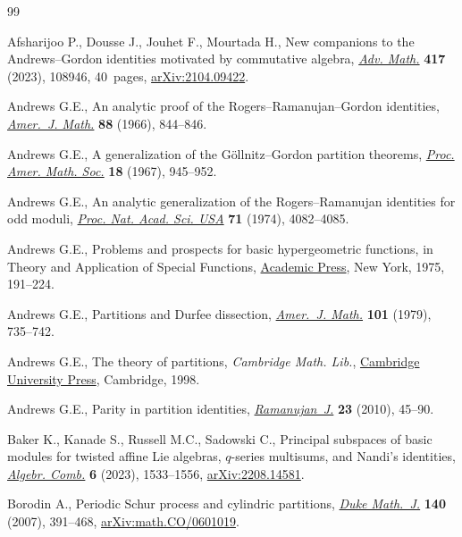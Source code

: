 \begin{thebibliography}{99}
\footnotesize\itemsep=0pt

Afsharijoo P., Dousse J., Jouhet F., Mourtada H., New companions to the
 {A}ndrews--{G}ordon identities motivated by commutative algebra,
 \href{https://doi.org/10.1016/j.aim.2023.108946}{\textit{Adv. Math.}}
 \textbf{417} (2023), 108946, 40~pages,
 \href{http://arxiv.org/abs/2104.09422}{arXiv:2104.09422}.

Andrews G.E., An analytic proof of the {R}ogers--{R}amanujan--{G}ordon
 identities, \href{https://doi.org/10.2307/2373082}{\textit{Amer.~J. Math.}}
 \textbf{88} (1966), 844--846.

Andrews G.E., A generalization of the {G}\"{o}llnitz--{G}ordon partition
 theorems, \href{https://doi.org/10.2307/2035143}{\textit{Proc. Amer. Math.
 Soc.}} \textbf{18} (1967), 945--952.

Andrews G.E., An analytic generalization of the {R}ogers--{R}amanujan
 identities for odd moduli,
 \href{https://doi.org/10.1073/pnas.71.10.4082}{\textit{Proc. Nat. Acad. Sci.
 USA}} \textbf{71} (1974), 4082--4085.

Andrews G.E., Problems and prospects for basic hypergeometric functions, in
 Theory and {A}pplication of {S}pecial {F}unctions,
 \href{https://doi.org/10.1016/B978-0-12-064850-4.50008-2}{Academic Press}, New
 York, 1975, 191--224.

Andrews G.E., Partitions and {D}urfee dissection,
 \href{https://doi.org/10.2307/2373804}{\textit{Amer.~J. Math.}} \textbf{101}
 (1979), 735--742.

Andrews G.E., The theory of partitions, \textit{Cambridge Math. Lib.},
 \href{https://doi.org/10.1017/CBO9780511608650}{Cambridge University Press},
 Cambridge, 1998.

Andrews G.E., Parity in partition identities,
 \href{https://doi.org/10.1007/s11139-008-9150-0}{\textit{Ramanujan~J.}}
 \textbf{23} (2010), 45--90.

Baker K., Kanade S., Russell M.C., Sadowski C., Principal subspaces of basic
 modules for twisted affine {L}ie algebras, {$q$}-series multisums, and
 {N}andi's identities, \href{https://doi.org/10.5802/alco.311}{\textit{Algebr.
 Comb.}} \textbf{6} (2023), 1533--1556,
 \href{http://arxiv.org/abs/2208.14581}{arXiv:2208.14581}.

Borodin A., Periodic {S}chur process and cylindric partitions,
 \href{https://doi.org/10.1215/S0012-7094-07-14031-6}{\textit{Duke Math.~J.}}
 \textbf{140} (2007), 391--468,
 \href{http://arxiv.org/abs/math.CO/0601019}{arXiv:math.CO/0601019}.


\end{thebibliography}
